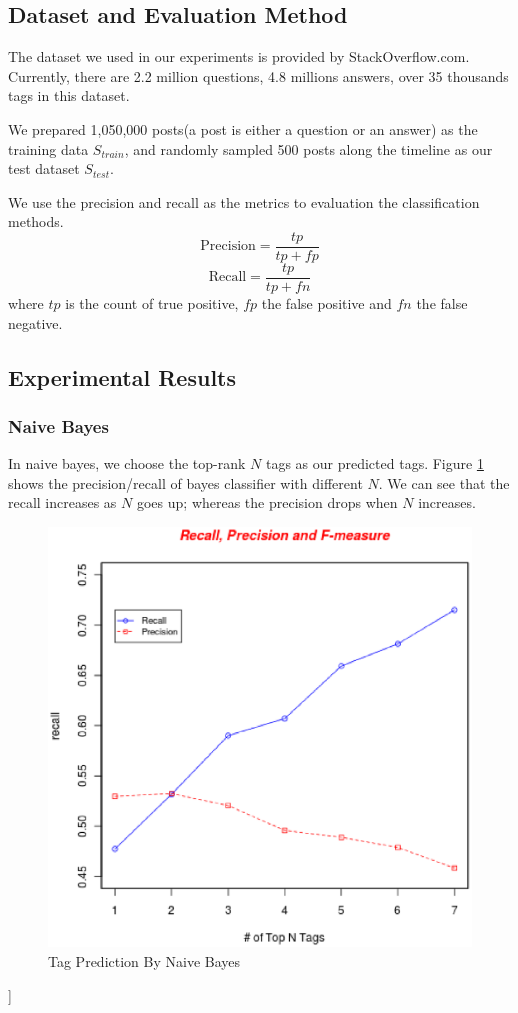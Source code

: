 
\subsection{Dataset and Evaluation Method}
The dataset we used in our experiments is provided by StackOverflow.com. Currently, there are 2.2 million questions, 4.8 millions answers, over 35 thousands tags in this dataset\cite{DataDump}.

We prepared 1,050,000 posts(a post is either a question or an answer)  as the training data $S_{train}$, and randomly sampled 500 posts along the timeline as our test dataset $S_{test}$.

We use the precision and recall as the metrics to evaluation the classification methods.
$$ \text{Precision}=\frac{tp}{tp+fp} $$
$$ \text{Recall}=\frac{tp}{tp+fn} $$
where $tp$ is the count of true positive, $fp$ the false positive and $fn$ the false negative.

\subsection{Experimental Results}
\subsubsection{Naive Bayes}
In naive bayes, we choose the top-rank $N$ tags as our predicted tags. Figure \ref{fig:naive} shows the precision/recall of bayes classifier with different $N$. We can see that the recall increases as $N$ goes up; whereas the precision drops when $N$ increases.

\begin{figure}[htb!]
\centering%
    \includegraphics[scale=0.5]{naives.eps}
\caption{Tag Prediction By Naive Bayes}
\label{fig:naive}
\end{figure}]


